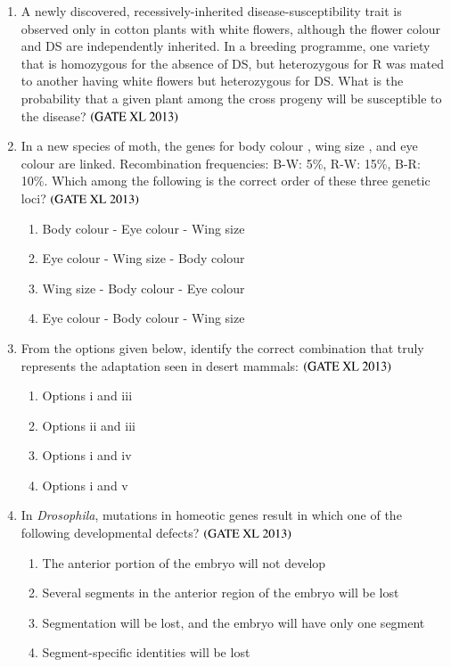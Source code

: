 \documentclass[journal]{IEEEtran}
\begin{document}
\begin{enumerate}
\item A newly discovered, recessively-inherited disease-susceptibility trait  is observed only in cotton plants with white flowers, although the flower colour  and DS are independently inherited. In a breeding programme, one variety that is homozygous for the absence of DS, but heterozygous for R was mated to another having white flowers but heterozygous for DS. What is the probability that a given plant among the cross progeny will be susceptible to the disease? \hfill $\left(\text{GATE XL 2013}\right)$
\begin{enumerate}
\end{enumerate}

\item In a new species of moth, the genes for body colour , wing size , and eye colour  are linked. Recombination frequencies: B-W: 5\%, R-W: 15\%, B-R: 10\%. Which among the following is the correct order of these three genetic loci? \hfill $\left(\text{GATE XL 2013}\right)$
\begin{enumerate}
    \item Body colour - Eye colour - Wing size
    \item Eye colour - Wing size - Body colour
    \item Wing size - Body colour - Eye colour
    \item Eye colour - Body colour - Wing size
\end{enumerate}

\item From the options given below, identify the correct combination that truly represents the adaptation seen in desert mammals: \hfill $\left(\text{GATE XL 2013}\right)$
\begin{enumerate}
    \item Options i and iii
    \item Options ii and iii
    \item Options i and iv
    \item Options i and v
\end{enumerate}

\item In \textit{Drosophila}, mutations in homeotic genes result in which one of the following developmental defects? \hfill $\left(\text{GATE XL 2013}\right)$
\begin{enumerate}
    \item The anterior portion of the embryo will not develop
    \item Several segments in the anterior region of the embryo will be lost
    \item Segmentation will be lost, and the embryo will have only one segment
    \item Segment-specific identities will be lost
\end{enumerate}


\end{enumerate}
\end{document}
